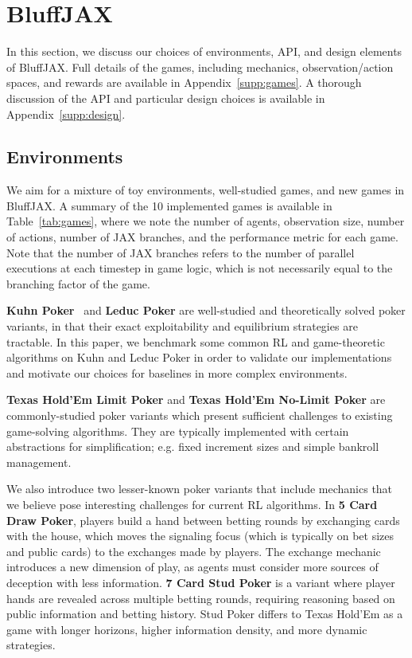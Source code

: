 \section{BluffJAX}
In this section, we discuss our choices of environments, API, and design elements of BluffJAX. Full details of the games, including mechanics, observation/action spaces, and rewards are available in Appendix~\ref{supp:games}. A thorough discussion of the API and particular design choices is available in Appendix~\ref{supp:design}. 

\subsection{Environments}
We aim for a mixture of toy environments, well-studied games, and new games in BluffJAX. A summary of the 10 implemented games is available in Table~\ref{tab:games}, where we note the number of agents, observation size, number of actions, number of JAX branches, and the performance metric for each game. Note that the number of JAX branches refers to the number of parallel executions at each timestep in game logic, which is not necessarily equal to the branching factor of the game.

\textbf{Kuhn Poker}~\citep{kuhn1953extensive} and \textbf{Leduc Poker} are well-studied and theoretically solved poker variants, in that their exact exploitability and equilibrium strategies are tractable. In this paper, we benchmark some common RL and game-theoretic algorithms on Kuhn and Leduc Poker in order to validate our implementations and motivate our choices for baselines in more complex environments.

\textbf{Texas Hold'Em Limit Poker} and \textbf{Texas Hold'Em No-Limit Poker} are commonly-studied poker variants which present sufficient challenges to existing game-solving algorithms. They are typically implemented with certain abstractions for simplification; e.g. fixed increment sizes and simple bankroll management. 

We also introduce two lesser-known poker variants that include mechanics that we believe pose interesting challenges for current RL algorithms. In \textbf{5 Card Draw Poker}, players build a hand between betting rounds by exchanging cards with the house, which moves the signaling focus (which is typically on bet sizes and public cards) to the exchanges made by players. The exchange mechanic introduces a new dimension of play, as agents must consider more sources of deception with less information. \textbf{7 Card Stud Poker} is a variant where player hands are revealed across multiple betting rounds, requiring reasoning based on public information and betting history. Stud Poker differs to Texas Hold'Em as a game with longer horizons, higher information density, and more dynamic strategies.

